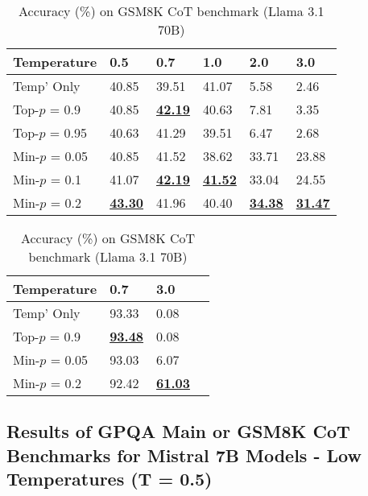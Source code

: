 \documentclass{article}
\begin{document}
\begin{table*}[ht]
\centering
\caption{Accuracy (\%) on GPQA Main and GSM8K CoT benchmarks for Llama 3.1 70B models}
\label{tab:merged_llama31_results}

\begin{subtable}[t]{\textwidth}
\centering
\caption{Accuracy (\%) on GPQA Main benchmark (Llama 3.1 70B)}
\vspace{-0.5em}
\begin{tabular}{llllll}
\toprule
Temperature & 0.5 & 0.7 & 1.0 & 2.0 & 3.0 \\
\midrule
Temp' Only & 40.85 & 39.51 & 41.07 & 5.58 & 2.46 \\
Top-\(p\) = 0.9 & 40.85 & \textbf{\underline{42.19}} & 40.63 & 7.81 & 3.35 \\
Top-\(p\) = 0.95 & 40.63 & 41.29 & 39.51 & 6.47 & 2.68 \\
Min-\(p\) = 0.05 & 40.85 & 41.52 & 38.62 & 33.71 & 23.88 \\
Min-\(p\) = 0.1 & 41.07 & \textbf{\underline{42.19}} & \textbf{\underline{41.52}} & 33.04 & 24.55 \\
Min-\(p\) = 0.2 & \textbf{\underline{43.30}} & 41.96 & 40.40 & \textbf{\underline{34.38}} & \textbf{\underline{31.47}} \\
\bottomrule
\end{tabular}
\end{subtable}

\vspace{0.5em}

\begin{subtable}[t]{\textwidth}
\centering
\caption{Accuracy (\%) on GSM8K CoT benchmark (Llama 3.1 70B)}
\vspace{-0.5em}
\begin{tabular}{llll}
\toprule
Temperature & 0.7 & 3.0 \\
\midrule
Temp' Only & 93.33 & 0.08 \\
Top-\(p\) = 0.9 & \textbf{\underline{93.48}} & 0.08 \\
Min-\(p\) = 0.05 & 93.03 & 6.07 \\
Min-\(p\) = 0.2 & 92.42 & \textbf{\underline{61.03}} \\
\bottomrule
\end{tabular}
\end{subtable}
\end{table*}

\subsection{Results of {GPQA Main or GSM8K CoT} Benchmarks for Mistral 7B Models - Low Temperatures (T = 0.5)}
\end{document}
